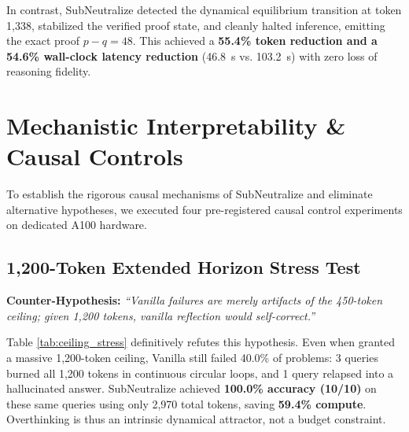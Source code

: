 \documentclass[10pt,twocolumn]{article}
\begin{document}
In contrast, SubNeutralize detected the dynamical equilibrium transition at token 1,338, stabilized the verified proof state, and cleanly halted inference, emitting the exact proof $p - q = 48$. This achieved a \textbf{55.4\% token reduction and a 54.6\% wall-clock latency reduction} (46.8~s vs. 103.2~s) with zero loss of reasoning fidelity.

\section{Mechanistic Interpretability \& Causal Controls}
\label{sec:controls}

To establish the rigorous causal mechanisms of SubNeutralize and eliminate alternative hypotheses, we executed four pre-registered causal control experiments on dedicated A100 hardware.

\subsection{1,200-Token Extended Horizon Stress Test}
\textbf{Counter-Hypothesis:} \emph{``Vanilla failures are merely artifacts of the 450-token ceiling; given 1,200 tokens, vanilla reflection would self-correct.''}

\begin{table}[htbp]
\centering
\small
\caption{1,200-Token Baseline Horizon Stress Test on Failed Problems.}
\label{tab:ceiling_stress}
\end{table}

Table \ref{tab:ceiling_stress} definitively refutes this hypothesis. Even when granted a massive 1,200-token ceiling, Vanilla still failed 40.0\% of problems: 3 queries burned all 1,200 tokens in continuous circular loops, and 1 query relapsed into a hallucinated answer. SubNeutralize achieved \textbf{100.0\% accuracy (10/10)} on these same queries using only 2,970 total tokens, saving \textbf{59.4\% compute}. Overthinking is thus an intrinsic dynamical attractor, not a budget constraint.
\end{document}
